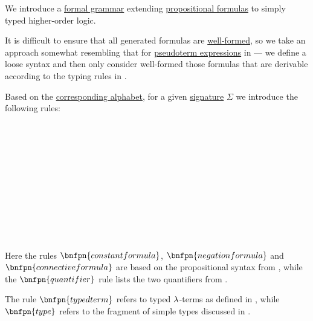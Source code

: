 \begin{definition}\label{def:simply_typed_hol_syntax}\mimprovised
  We introduce a \hyperref[def:formal_grammar]{formal grammar} extending \hyperref[def:propositional_syntax/formula]{propositional formulas} to simply typed higher-order logic.

 It is difficult to ensure that all generated formulas are \hyperref[con:expression]{well-formed}, so we take an approach somewhat resembling that for \hyperref[con:pseudoterm_expression]{pseudoterm expressions} in  --- we define a loose syntax and then only consider well-formed those formulas that are derivable according to the typing rules in .

  Based on the \hyperref[def:simply_typed_hol_alphabet]{corresponding alphabet}, for a given \hyperref[def:simply_typed_hol_signature]{signature} \( \Sigma \) we introduce the following rules:
  \begin{bnf*}
               {} \\
     { \bnfsp \bnftsq{\( : \)} \bnfsp {}} \\
     { \bnfsp {} \bnfsp {} \bnfsp {}} \\
         {} \\
       { \bnfsp \bnftsq{\( \syneq \)} \bnfsp {}} \\
                { \bnfor} \\
     \\
     \\
     \\
     \\
  \end{bnf*}

  Here the rules \( \bnfpn{constant formula} \), \( \bnfpn{negation formula} \) and \( \bnfpn{connective formula} \) are based on the propositional syntax from , while the \( \bnfpn{quantifier} \) rule lists the two quantifiers from .

  The rule \( \bnfpn{typed term} \) refers to typed \( {\mathrm \lambda} \)-terms as defined in , while \( \bnfpn{type} \) refers to the fragment of simple types discussed in .
\end{definition}

